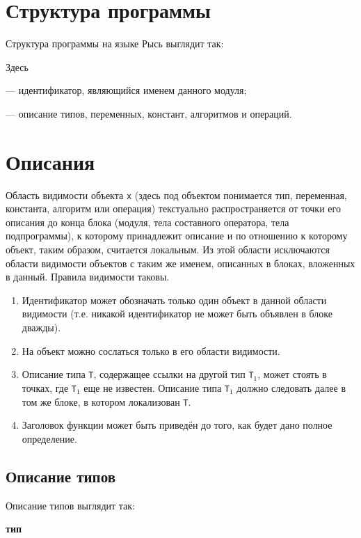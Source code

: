 \documentclass[10pt]{report}
\begin{document}
    \section{Структура программы}
Структура программы на языке Рысь выглядит так:


Здесь

\noindent\textcolor{Green}{} --- идентификатор, являющийся именем данного модуля;

\noindent\textcolor{Green}{} --- описание типов, переменных, констант, алгоритмов и операций.


    \section{Описания}

Область видимости объекта \texttt{x} (здесь под объектом понимается тип, переменная, константа, алгоритм или операция) текстуально распространяется от точки его описания до
конца блока (модуля, тела составного оператора, тела подпрограммы), к которому принадлежит описание и по отношению к которому объект, таким образом, считается локальным. Из
этой области исключаются области видимости объектов с таким же именем, описанных в блоках, вложенных в данный. Правила видимости таковы.
\begin{enumerate}
    \item Идентификатор может обозначать только один объект в данной области видимости (т.е. никакой идентификатор не может быть объявлен в блоке дважды).
    \item На объект можно сослаться только в его области видимости.
    \item Описание типа \texttt{T}, содержащее ссылки на другой тип \texttt{T}$_1$, может стоять в точках, где \texttt{T}$_1$ еще не известен. Описание типа \texttt{T}$_1$
должно следовать далее в том же блоке, в котором локализован \texttt{T}.
    \item Заголовок функции может быть приведён до того, как будет дано полное определение.
\end{enumerate}

        \subsection{Описание типов}
Описание типов выглядит так:
\begin{center}
\noindent\textbf{тип} \textcolor{Green}{}
\end{center}
\end{document}
